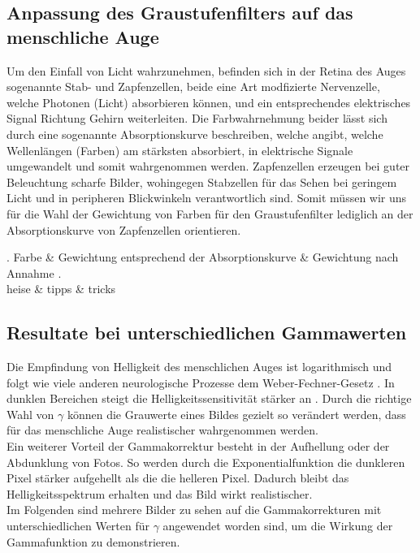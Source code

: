 \documentclass[course=erap]{aspdoc}
\begin{document}
\subsection{Anpassung des Graustufenfilters auf das menschliche Auge}
Um den Einfall von Licht wahrzunehmen, befinden sich in der Retina des Auges sogenannte Stab- und Zapfenzellen, beide eine Art modfizierte Nervenzelle, welche Photonen (Licht) absorbieren können, und ein entsprechendes elektrisches Signal Richtung Gehirn weiterleiten.
Die Farbwahrnehmung beider lässt sich durch eine sogenannte Absorptionskurve beschreiben, welche angibt, welche Wellenlängen (Farben) am stärksten absorbiert, in elektrische Signale umgewandelt und somit wahrgenommen werden.
Zapfenzellen erzeugen bei guter Beleuchtung scharfe Bilder, wohingegen Stabzellen für das Sehen bei geringem Licht und in peripheren Blickwinkeln verantwortlich sind. Somit müssen wir uns für die Wahl der Gewichtung von Farben für den Graustufenfilter lediglich an der Absorptionskurve von Zapfenzellen orientieren.
\begin{tabular}
.		Farbe & Gewichtung entsprechend der Absorptionskurve & Gewichtung nach Annahme . \\
	heise & tipps & tricks \\
\end{tabular}

\subsection{Resultate bei unterschiedlichen Gammawerten}
Die Empfindung von Helligkeit des menschlichen Auges ist logarithmisch und folgt wie viele anderen neurologische Prozesse dem Weber-Fechner-Gesetz \cite{weberFechnerGesetz}. In dunklen Bereichen steigt die Helligkeitssensitivität stärker an \cite{Logarithmische_Helligkeitswahrnehmung}. Durch die richtige Wahl von $\gamma$ können die Grauwerte eines Bildes gezielt so verändert werden, dass für das menschliche Auge realistischer wahrgenommen werden. 
\\
\newline
Ein weiterer Vorteil der Gammakorrektur besteht in der Aufhellung oder der Abdunklung von Fotos. So werden durch die Exponentialfunktion die dunkleren Pixel stärker aufgehellt als die die helleren Pixel. \cite{gammKorrekturWikipedia}
Dadurch bleibt das Helligkeitsspektrum erhalten und das Bild wirkt realistischer. 
\\
\newline
Im Folgenden sind mehrere Bilder zu sehen auf die Gammakorrekturen mit unterschiedlichen Werten für $\gamma$ angewendet worden sind, um die Wirkung der Gammafunktion zu demonstrieren.    
\end{document}

